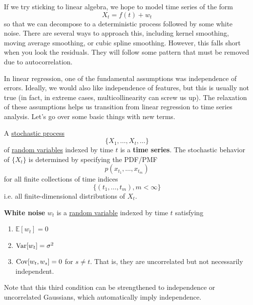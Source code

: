 If we try sticking to linear algebra, we hope to model time series of the form 
\begin{equation}
  X_t = f(t) + w_t
\end{equation}
so that we can decompose to a deterministic process followed by some white noise. There are several ways to approach this, including kernel smoothing, moving average smoothing, or cubic spline smoothing. However, this falls short when you look the residuals. They will follow some pattern that must be removed due to autocorrelation. 

In linear regression, one of the fundamental assumptions was  independence of errors. Ideally, we would also like independence of features, but this is usually not true (in fact, in extreme cases, multicollinearity can screw us up). The relaxation of these assumptions helps us transition from linear regression to time series analysis. Let's go over some basic things with new terms. 

\begin{definition}
  \label{def:time-series}
  A \hyperref[sp-def:stochastic-process]{stochastic process} 
  \begin{equation}
    \{X_1, \ldots, X_t, \ldots \}
  \end{equation}
  of \hyperref[prob-def:random-variable]{random variables} indexed by time $t$ is a \textbf{time series}. The stochastic behavior of $\{X_t\}$ is determined by specifying the PDF/PMF 
  \begin{equation}
    p(x_{t_1}, \ldots, x_{t_m}) 
  \end{equation}
  for all finite collections of time indices 
  \begin{equation}
    \{(t_1, \ldots, t_m), m < \infty \}
  \end{equation}
  i.e. all finite-dimensional distributions of $X_t$. 
\end{definition}

\begin{definition}
  \label{def:white-noise}
  \textbf{White noise} $w_t$ is a \hyperref[prob-def:random-variable]{random variable} indexed by time $t$ satisfying 
  \begin{enumerate}
    \item $\mathbb{E}[w_t] = 0$
    \item $\operatorname{Var}[w_t] = \sigma^2$
    \item $\operatorname{Cov}[w_t, w_s] = 0$ for $s \neq t$. That is, they are uncorrelated but not necessarily independent. 
  \end{enumerate}
  Note that this third condition can be strengthened to independence or uncorrelated Gaussians, which automatically imply independence. 
\end{definition}

